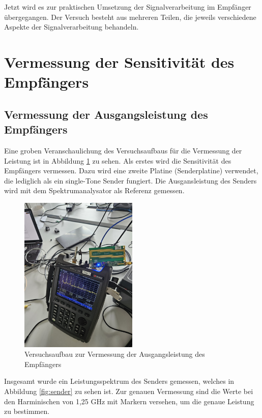 Jetzt wird es zur praktischen Umsetzung der Signalverarbeitung im Empfänger übergegangen. Der Versuch besteht aus mehreren Teilen, die jeweils verschiedene Aspekte der Signalverarbeitung behandeln.

\section{Vermessung der Sensitivität des Empfängers} %
\subsection{Vermessung der Ausgangsleistung des Empfängers}
Eine groben Veranschaulichung des Versuchsaufbaus für die Vermessung der Leistung ist in Abbildung \ref{fig:versuchsaufbau} zu sehen. 
Als erstes wird die Sensitivität des Empfängers vermessen. Dazu wird eine zweite Platine (Senderplatine) verwendet, die lediglich als ein single-Tone Sender fungiert. Die Ausgansleistung des Senders wird mit dem Spektrumanalysator als Referenz gemessen. 
\begin{figure}[H]
    \centering
    \includegraphics[width=0.5\textwidth]{Pictures/VersuchsaufbauLeistung.jpg}
    \caption{Versuchsaufbau zur Vermessung der Ausgangsleistung des Empfängers}
    \label{fig:versuchsaufbau}
\end{figure}

Insgesamt wurde ein Leistungsspektrum des Senders gemessen, welches in Abbildung \ref{fig:sender} zu sehen ist. Zur genauen Vermessung sind die Werte bei den Harminischen von 1,25 GHz mit Markern versehen, um die genaue Leistung zu bestimmen.


